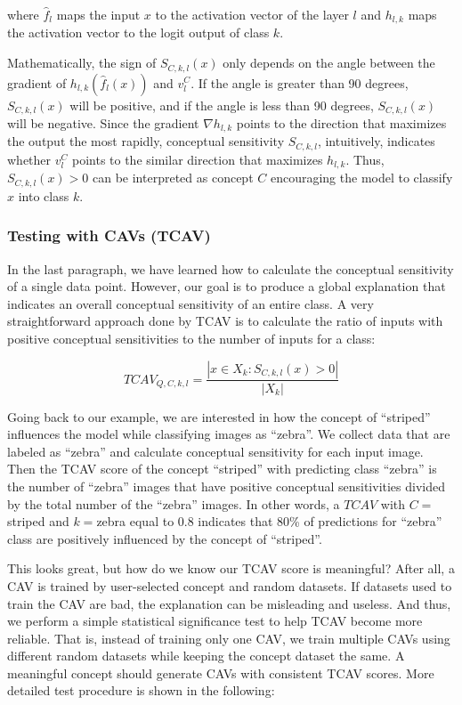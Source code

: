 \documentclass[
  11pt,
]{scrbook}
\begin{document}
where \(\hat{f}_l\) maps the input \(x\) to the activation vector of the layer \(l\) and \(h_{l,k}\) maps the activation vector to the logit output of class \(k\).

Mathematically, the sign of \(S_{C,k,l}(x)\) only depends on the angle between the gradient of \(h_{l,k}(\hat{f}_l(x))\) and \(v_l^C\).
If the angle is greater than 90 degrees, \(S_{C,k,l}(x)\) will be positive, and if the angle is less than 90 degrees, \(S_{C,k,l}(x)\) will be negative.
Since the gradient \(\nabla h_{l,k}\) points to the direction that maximizes the output the most rapidly, conceptual sensitivity \(S_{C,k,l}\), intuitively, indicates whether \(v_l^C\) points to the similar direction that maximizes \(h_{l,k}\).
Thus, \(S_{C,k,l}(x)>0\) can be interpreted as concept \(C\) encouraging the model to classify \(x\) into class \(k\).

\hypertarget{testing-with-cavs-tcav}{%
\subsubsection{Testing with CAVs (TCAV)}\label{testing-with-cavs-tcav}}

In the last paragraph, we have learned how to calculate the conceptual sensitivity of a single data point.
However, our goal is to produce a global explanation that indicates an overall conceptual sensitivity of an entire class.
A very straightforward approach done by TCAV is to calculate the ratio of inputs with positive conceptual sensitivities to the number of inputs for a class:

\[TCAV_{Q,C,k,l}=\frac{|{x\in X_k:S_{C,k,l}(x)>0}|}{|X_k|}\]

Going back to our example, we are interested in how the concept of ``striped'' influences the model while classifying images as ``zebra''.
We collect data that are labeled as ``zebra'' and calculate conceptual sensitivity for each input image.
Then the TCAV score of the concept ``striped'' with predicting class ``zebra'' is the number of ``zebra'' images that have positive conceptual sensitivities divided by the total number of the ``zebra'' images.
In other words, a \(TCAV\) with \(C=\)striped and \(k=\)zebra equal to 0.8 indicates that 80\% of predictions for ``zebra'' class are positively influenced by the concept of ``striped''.

This looks great, but how do we know our TCAV score is meaningful?
After all, a CAV is trained by user-selected concept and random datasets.
If datasets used to train the CAV are bad, the explanation can be misleading and useless.
And thus, we perform a simple statistical significance test to help TCAV become more reliable.
That is, instead of training only one CAV, we train multiple CAVs using different random datasets while keeping the concept dataset the same.
A meaningful concept should generate CAVs with consistent TCAV scores.
More detailed test procedure is shown in the following:
\end{document}
